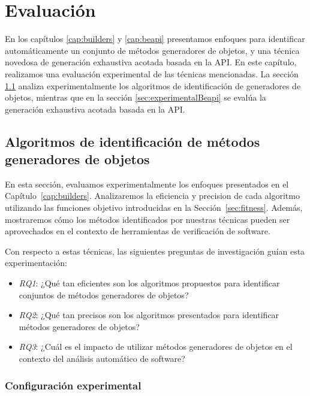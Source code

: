 \chapter[Evaluaci\'on]{Evaluaci\'on}
\label{cap:experimental}


En los capítulos \ref{cap:builders} y \ref{cap:beapi} presentamos enfoques para
identificar automáticamente un conjunto de métodos generadores de objetos, y una
técnica novedosa de generación exhaustiva acotada basada en la API. 
En este capítulo, realizamos una evaluación experimental de las técnicas
mencionadas. La sección \ref{sec:experimentalIdentificacion} analiza experimentalmente los
algoritmos de identificación de generadores de objetos, mientras que en la
sección \ref{sec:experimentalBeapi} se evalúa la generación exhaustiva acotada basada en la API.


\section{Algoritmos de identificación de métodos generadores de objetos}
\label{sec:experimentalIdentificacion}

En esta sección, evaluamos experimentalmente los enfoques presentados en el
Capítulo~\ref{cap:builders}. Analizaremos la eficiencia y precision de cada
algoritmo utilizando las funciones objetivo introducidas en la
Sección~\ref{sec:fitness}. Además, mostraremos cómo los métodos identificados
por nuestras técnicas pueden ser aprovechados en el contexto de herramientas
de verificación de software.

Con respecto a estas técnicas, las siguientes preguntas de investigación guían esta experimentación:

\begin{itemize}
\item \emph{RQ1}: ¿Qué tan eficientes son los algoritmos propuestos para
    identificar conjuntos de métodos generadores de objetos?
\item \emph{RQ2}: ¿Qué tan precisos son los algoritmos presentados para identificar métodos generadores de objetos?
\item \emph{RQ3}: ¿Cuál es el impacto de utilizar métodos generadores de objetos
    en el contexto del análisis automático de software?
\end{itemize}

\subsection{Configuraci\'on experimental}

